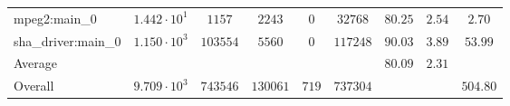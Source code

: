 \begin{tabular}{|l|c|c|c|c|c|c|c|c|}
mpeg2:main\_0           & $ 1.442 \cdot 10^{1} $ & $ 1157   $ & $ 2243   $ & $ 0   $ & $ 32768  $ & $ 80.25       $ & $ 2.54    $ & $ 2.70    $ \\
sha\_driver:main\_0     & $ 1.150 \cdot 10^{3} $ & $ 103554 $ & $ 5560   $ & $ 0   $ & $ 117248 $ & $ 90.03       $ & $ 3.89    $ & $ 53.99   $ \\
\hline
Average                 & $                    $ & $        $ & $        $ & $     $ & $        $ & $ 80.09       $ & $ 2.31    $ & $         $ \\
\hline
Overall                 & $ 9.709 \cdot 10^{3} $ & $ 743546 $ & $ 130061 $ & $ 719 $ & $ 737304 $ & $             $ & $         $ & $ 504.80  $ \\
\hline
\end{tabular}
